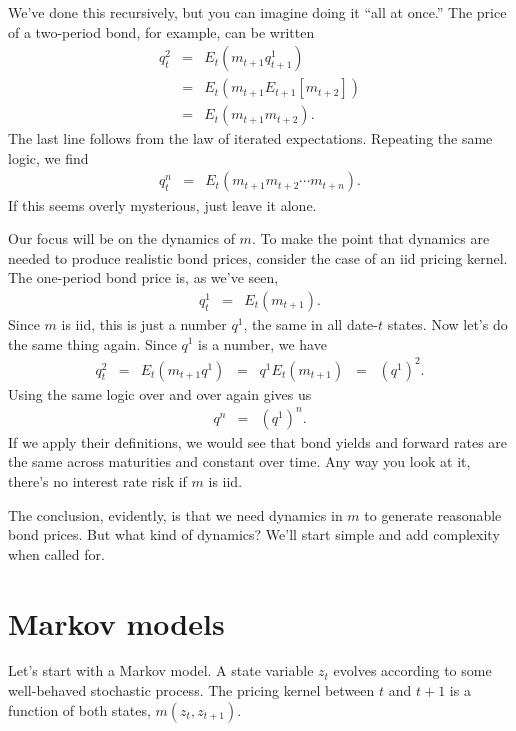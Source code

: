 \documentclass[11pt]{article}
\begin{document}
We've done this recursively, but you can imagine doing it ``all at once.''
The price of a two-period bond, for example, can be written
\begin{eqnarray*}
    q^{2}_t &=& E_t \left( m_{t+1} q^1_{t+1} \right) \\
            &=& E_t \left( m_{t+1} E_{t+1} [m_{t+2}] \right) \\
            &=& E_t \left( m_{t+1} m_{t+2} \right) .
\end{eqnarray*}
The last line follows from the law of iterated expectations.
Repeating the same logic, we find
\begin{eqnarray*}
    q^{n}_t  &=& E_t \left( m_{t+1} m_{t+2} \cdots m_{t+n} \right) .
\end{eqnarray*}
If this seems overly mysterious, just leave it alone.


Our focus will be on the dynamics of $m$.
To make the point that dynamics are needed to produce realistic
bond prices, consider the case of an iid pricing kernel.
The one-period bond price is, as we've seen,
\begin{eqnarray*}
    q^{1}_t &=& E_t \left( m_{t+1} \right) .
\end{eqnarray*}
Since $m$ is iid, this is just a number $q^1$,
the same in all date-$t$ states.
%
Now let's do the same thing again.
Since $q^1 $ is a number, we have
\begin{eqnarray*}
    q^{2}_t &=& E_t \left( m_{t+1} q^1 \right)
            \;\;=\;\;  q^1 E_t \left( m_{t+1}  \right)
            \;\;=\;\;  (q^1)^2 .
\end{eqnarray*}
Using the same logic over and over again gives us
\begin{eqnarray*}
    q^{n} &=& (q^1)^n .
\end{eqnarray*}
If we apply their definitions,
we would see that bond yields and forward rates are the same across maturities
and constant over time.
Any way you look at it, there's no interest rate risk if $m$ is iid.

The conclusion, evidently, is that we need dynamics in $m$
to generate reasonable bond prices.
But what kind of dynamics?
We'll start simple and add complexity when called for.


\section{Markov models}

Let's start with a Markov model.
A state variable $z_t$ evolves according to
some well-behaved stochastic process.
The pricing kernel between $t$ and $t+1$ is a function of both
states, $m (z_t, z_{t+1})$.
\end{document}

